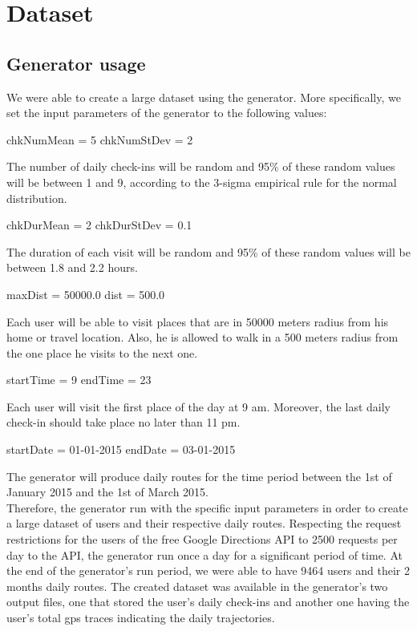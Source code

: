 \chapter{Dataset}

\section{Generator usage}

We were able to create a large dataset using the generator. More specifically, we set the input parameters of the generator to the following values:

\begin{center}
 chkNumMean = 5 chkNumStDev = 2
\end{center}

The number of daily check-ins will be random and 95\% of these random values will be between 1 and 9, according to the 3-sigma empirical rule for the normal 
distribution. 

\begin{center}
 chkDurMean = 2 chkDurStDev = 0.1
\end{center}

The duration of each visit will be random and 95\% of these random values will be between 1.8 and 2.2 hours.

\begin{center}
 maxDist = 50000.0 dist = 500.0
\end{center}

Each user will be able to visit places that are in 50000 meters radius from his home or travel location. Also, he is allowed to walk in a 500 meters radius 
from the one place he visits to the next one.

\begin{center}
 startTime = 9 endTime = 23
\end{center}

Each user will visit the first place of the day at 9 am. Moreover, the last daily check-in should take place no later than 11 pm.

\begin{center}
 startDate = 01-01-2015 endDate = 03-01-2015
\end{center}

The generator will produce daily routes for the time period between the 1st of January 2015 and the 1st of March 2015. \\

Therefore, the generator run with the specific input parameters in order to create a large dataset of users and their respective daily routes. 
Respecting the request restrictions for the users of the free Google Directions API to 2500 requests per day to the API, the generator run 
once a day for a significant period of time. At the end of the generator's run period, we were able to have 9464 users and their 2 months daily routes. 
The created dataset was available in the generator's two output files, one that stored the user's daily check-ins and another one having the user's total 
gps traces indicating the daily trajectories. 

